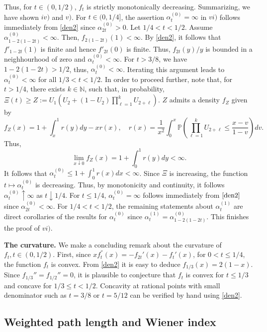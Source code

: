 \documentclass{amsart}       %
\newcommand{\N}{\ensuremath{\mathbb N}}
\newcommand{\Prob}[1]{\ensuremath{\mathbb{P} \left(#1 \right)}}
\begin{document}
Thus, for $t \in (0, 1/2)$, $f_t$ is strictly monotonically decreasing.  Summarizing, we have shown $iv)$ and $v)$. For $t \in (0,1/4]$, the assertion $\alpha^{(0)}_t = \infty$ in $vi)$ follows immediately from \eqref{den2} since $\alpha^{(0)}_{2t} > 0$.
Let $1/4 < t < 1/2$. Assume $\alpha^{(0)}_{1-2(1-2t)} < \infty$. Then, $f_{2(1-2t)}(1) < \infty$. By \eqref{den2}, it follows that $f'_{1-2t}(1)$ is finite and hence $f'_{2t}(0)$ is finite. Thus, $f_{2t}(y) / y$ is bounded in a neighhourhood of zero and $\alpha^{(0)}_t < \infty$. For $t > 3/8$, we have $1-2(1-2t) > 1/2$, thus, $\alpha^{(0)}_t < \infty$. Iterating this argument leads to $\alpha_t^{(0)} < \infty$ for all $1/3 < t < 1/2$. 
In order to proceed further, note that, for $t > 1/4$, there exists $k \in \N$, such that, in probability, $\Xi(t) \geq Z := U_1(U_2 + (1-U_2)\prod_{\ell = 1}^kU_{2+\ell}).$
$Z$ admits a density $f_Z$ given by
$$f_Z(x) = 1 + \int_x^1 r(y) dy - x r(x), \quad r(x) = \frac{1}{x^2} \int_0^x \Prob{\prod_{\ell = 1}^kU_{2+\ell} \leq \frac{x-v}{1-v}} dv.$$
Thus, $$\lim_{x \downarrow 0} f_Z(x) = 1 + \int_0^1 r(y) dy < \infty.$$ It follows that $\alpha_t^{(0)} \leq  1 + \int_0^1 r(x) dx < \infty$. Since $\Xi$ is increasing, the function $t \mapsto \alpha_t^{(0)}$ is decreasing. Thus, by monotonicity and continuity, it follows $\alpha^{(0)}_t \uparrow \infty$ as $t \downarrow 1/4$. 
For $t \leq 1/4$, $\alpha^{(0)}_t = \infty$ follows immediately from $\eqref{den2}$ since $\alpha^{(0)}_{2t} < \infty$. For $1/4 < t < 1/2$, the remaining statements about $\alpha_t^{(1)}$ are direct corollaries of the results for $\alpha_t^{(0)}$ since $\alpha^{(1)}_t = \alpha^{(0)}_{1 -2(1-2t)}$. This finishes the proof of $vi)$.

\medskip \textbf{The curvature.} We make a concluding remark about the curvature of $f_t, t \in (0,1/2)$. First, since $x f^{''}_t(x) = - f_{2t}'(x) - f_t'(x)$, for $0 < t \leq 1/4$,  the function $f_t$ is convex. 
From \eqref{den2} it is easy to deduce $f_{1/3}(x) = 2(1-x)$. Since $f_{1/3}'' = f_{1/2}'' = 0$, it is plausible to conjecture that $f_t$ is convex for $t \leq 1/3$ and concave for $1/3 \leq t < 1/2$. Concavity at rational points with small denominator such as $t = 3/8$ or $t = 5/12$ can be verified by hand using \eqref{den2}.

\subsection{Weighted path length and Wiener index} \label{sec:pathlength} 
\end{document}
